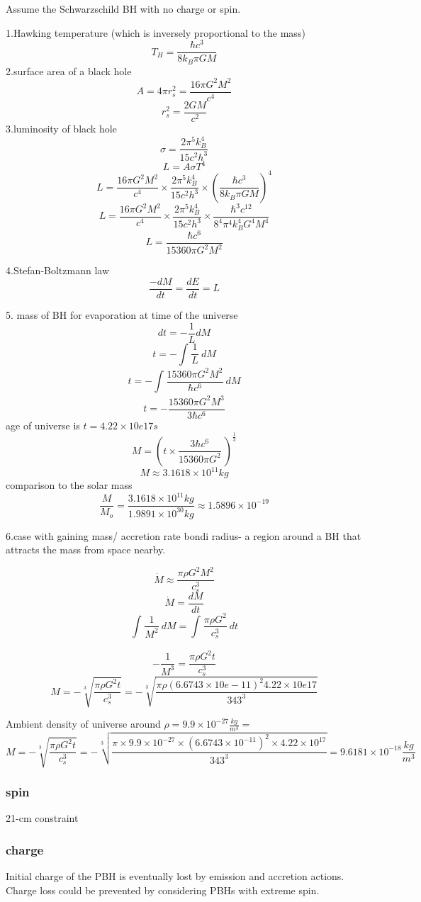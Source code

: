 ﻿\documentclass{article}
\begin{document}
Assume the Schwarzschild BH with no charge or spin. 

1.Hawking temperature (which is inversely proportional to the mass) 
\[T_H=\frac{\hbar c^3}{8k_B\pi GM}\]
2.surface area of a black hole
\[A=4\pi r_s^2=\frac{16\pi G^2 M^2}{c^4}\]
\[r_s^2=\frac{2GM}{c^2}\]
3.luminosity of black hole
\[\sigma=\frac{2\pi^5 k_B^4}{15c^2h^3}\]
\[L=A\sigma T^4 \]
\[L=\frac{16\pi G^2 M^2}{c^4} \times \frac{2\pi^5 k_B^4}{15c^2h^3} \times (\frac{\hbar c^3}{8k_B\pi GM})^4\]
\[L=\frac{16\pi G^2 M^2}{c^4} \times \frac{2\pi^5 k_B^4}{15c^2h^3} \times \frac{\hbar^3 c^{12}}{8^4 \pi^4 k_B^4 G^4 M^4}\]
\[L=\frac{\hbar c^6}{15360\pi G^2 M^2}\]

4.Stefan-Boltzmann law
\[\frac{-dM}{dt}=\frac{dE}{dt}=L\]

5. mass of BH for evaporation at time of the universe
\[dt=-\frac{1}{L} dM\]
\[t=-\int_{}^{} \frac{1}{L} \ dM\]
\[t=-\int_{}^{} \frac{15360\pi G^2 M^2}{\hbar c^6} \ dM\]
\[t=- \frac{15360\pi G^2 M^3}{3 \hbar c^6}\]
age of universe is \(t=4.22 \times 10e17s\) 
\[M=(t \times  \frac{3 \hbar c^6}{15360\pi G^2 }\ )^\frac{1}{3}\]
\[M \approx 3.1618 \times 10^{11} kg\]
comparison to the solar mass
\[\frac{M}{M_o}=\frac{3.1618 \times 10^{11} kg}{1.9891 \times 10^{30} kg} \approx 1.5896 \times 10^{-19}\]

6.case with gaining mass/ accretion rate
bondi radius- a region around a BH that attracts the mass from space nearby. 

\[\dot M \approx \frac{\pi \rho G^2 M^2}{c_s^3}\]
\[\dot M=\frac{dM}{dt}\]
\[\int_{}^{} \frac{1}{M^2}\ dM=\int_{}^{} \frac{\pi \rho G^2}{c_s^3}\ dt\]

\[-\frac{1}{M^3}=\frac{\pi \rho G^2 t}{c_s^3} \]
\[M=-\sqrt[3]{\frac{\pi \rho G^2 t}{c_s^3}}=-\sqrt[3]{\frac{\pi \rho (6.6743 \times 10e-11 )^2 4.22 \times 10e17}{343^3}}\]

Ambient density of universe around \(\rho=9.9 \times 10^{-27} \frac{kg}{m^3}=\)
\[M=-\sqrt[3]{\frac{\pi \rho G^2 t}{c_s^3}}=-\sqrt[3]{\frac{\pi \times 9.9 \times 10^{-27} \times  (6.6743 \times 10^{-11} )^2 \times 4.22 \times 10^{17}}{343^3}}=9.6181 \times 10^{-18}  \frac{kg}{m^3}\]





\subsubsection {spin}
21-cm constraint 

\subsubsection {charge}
Initial charge of the PBH is eventually lost by emission and accretion actions. Charge loss could be prevented by considering PBHs with extreme spin. 
\end{document}
